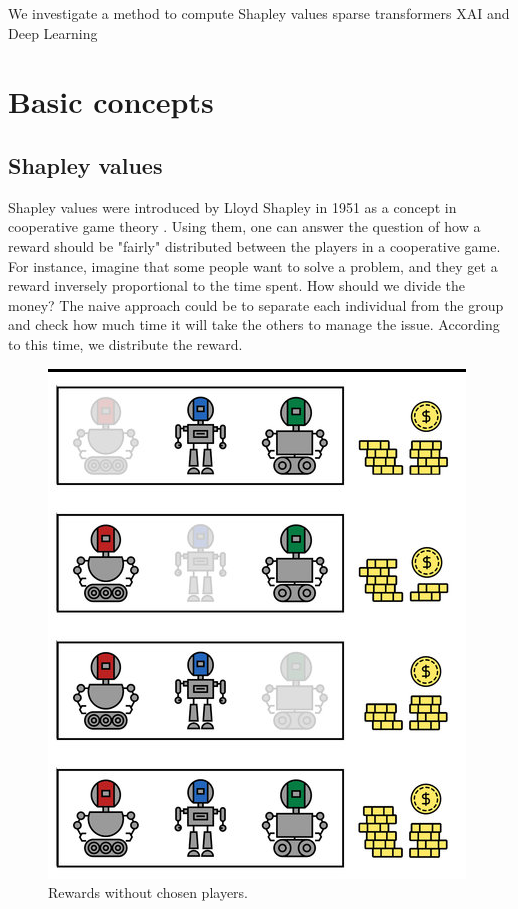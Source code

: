 \documentclass[magisterska,en]{pracamgr}
\begin{document}
We investigate a method to compute Shapley values
sparse transformers
XAI and Deep Learning


\chapter{Basic concepts}\label{r:concepts}


\section{Shapley values}
Shapley values were introduced by Lloyd Shapley in 1951 as a concept in cooperative game theory \cite{ShapleyValues}.
Using them, one can answer the question of how a reward should be "fairly" distributed between the players in a cooperative game. For instance, imagine that some people want to solve a problem, and they get a reward inversely proportional to the time spent. How should we divide the money? The naive approach could be to separate each individual from the group and check how much time it will take the others to manage the issue. According to this time, we distribute the reward.

\begin{figure}[H]
\centering
\includegraphics[scale=0.3]{./images/Shap_coal_2.png}
\caption{Rewards without chosen players.}
\end{figure}
\end{document}
